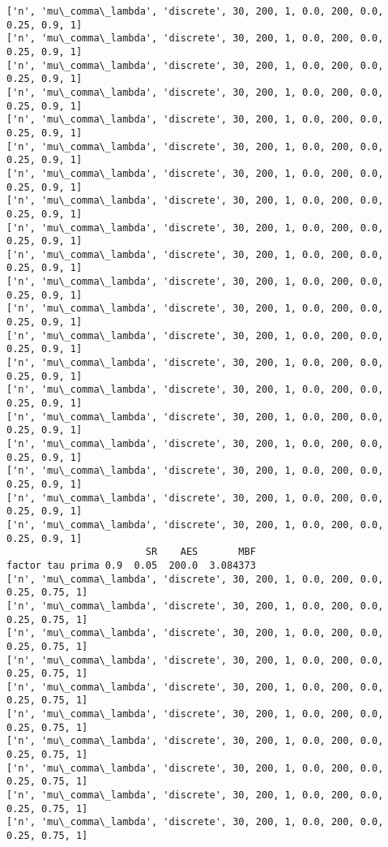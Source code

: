 \documentclass[11pt]{article}
\begin{document}
    \begin{Verbatim}[commandchars=\\\{\}]
['n', 'mu\_comma\_lambda', 'discrete', 30, 200, 1, 0.0, 200, 0.0, 0.25, 0.9, 1]
['n', 'mu\_comma\_lambda', 'discrete', 30, 200, 1, 0.0, 200, 0.0, 0.25, 0.9, 1]
['n', 'mu\_comma\_lambda', 'discrete', 30, 200, 1, 0.0, 200, 0.0, 0.25, 0.9, 1]
['n', 'mu\_comma\_lambda', 'discrete', 30, 200, 1, 0.0, 200, 0.0, 0.25, 0.9, 1]
['n', 'mu\_comma\_lambda', 'discrete', 30, 200, 1, 0.0, 200, 0.0, 0.25, 0.9, 1]
['n', 'mu\_comma\_lambda', 'discrete', 30, 200, 1, 0.0, 200, 0.0, 0.25, 0.9, 1]
['n', 'mu\_comma\_lambda', 'discrete', 30, 200, 1, 0.0, 200, 0.0, 0.25, 0.9, 1]
['n', 'mu\_comma\_lambda', 'discrete', 30, 200, 1, 0.0, 200, 0.0, 0.25, 0.9, 1]
['n', 'mu\_comma\_lambda', 'discrete', 30, 200, 1, 0.0, 200, 0.0, 0.25, 0.9, 1]
['n', 'mu\_comma\_lambda', 'discrete', 30, 200, 1, 0.0, 200, 0.0, 0.25, 0.9, 1]
['n', 'mu\_comma\_lambda', 'discrete', 30, 200, 1, 0.0, 200, 0.0, 0.25, 0.9, 1]
['n', 'mu\_comma\_lambda', 'discrete', 30, 200, 1, 0.0, 200, 0.0, 0.25, 0.9, 1]
['n', 'mu\_comma\_lambda', 'discrete', 30, 200, 1, 0.0, 200, 0.0, 0.25, 0.9, 1]
['n', 'mu\_comma\_lambda', 'discrete', 30, 200, 1, 0.0, 200, 0.0, 0.25, 0.9, 1]
['n', 'mu\_comma\_lambda', 'discrete', 30, 200, 1, 0.0, 200, 0.0, 0.25, 0.9, 1]
['n', 'mu\_comma\_lambda', 'discrete', 30, 200, 1, 0.0, 200, 0.0, 0.25, 0.9, 1]
['n', 'mu\_comma\_lambda', 'discrete', 30, 200, 1, 0.0, 200, 0.0, 0.25, 0.9, 1]
['n', 'mu\_comma\_lambda', 'discrete', 30, 200, 1, 0.0, 200, 0.0, 0.25, 0.9, 1]
['n', 'mu\_comma\_lambda', 'discrete', 30, 200, 1, 0.0, 200, 0.0, 0.25, 0.9, 1]
['n', 'mu\_comma\_lambda', 'discrete', 30, 200, 1, 0.0, 200, 0.0, 0.25, 0.9, 1]
                        SR    AES       MBF
factor tau prima 0.9  0.05  200.0  3.084373
['n', 'mu\_comma\_lambda', 'discrete', 30, 200, 1, 0.0, 200, 0.0, 0.25, 0.75, 1]
['n', 'mu\_comma\_lambda', 'discrete', 30, 200, 1, 0.0, 200, 0.0, 0.25, 0.75, 1]
['n', 'mu\_comma\_lambda', 'discrete', 30, 200, 1, 0.0, 200, 0.0, 0.25, 0.75, 1]
['n', 'mu\_comma\_lambda', 'discrete', 30, 200, 1, 0.0, 200, 0.0, 0.25, 0.75, 1]
['n', 'mu\_comma\_lambda', 'discrete', 30, 200, 1, 0.0, 200, 0.0, 0.25, 0.75, 1]
['n', 'mu\_comma\_lambda', 'discrete', 30, 200, 1, 0.0, 200, 0.0, 0.25, 0.75, 1]
['n', 'mu\_comma\_lambda', 'discrete', 30, 200, 1, 0.0, 200, 0.0, 0.25, 0.75, 1]
['n', 'mu\_comma\_lambda', 'discrete', 30, 200, 1, 0.0, 200, 0.0, 0.25, 0.75, 1]
['n', 'mu\_comma\_lambda', 'discrete', 30, 200, 1, 0.0, 200, 0.0, 0.25, 0.75, 1]
['n', 'mu\_comma\_lambda', 'discrete', 30, 200, 1, 0.0, 200, 0.0, 0.25, 0.75, 1]

\end{Verbatim}
\end{document}
